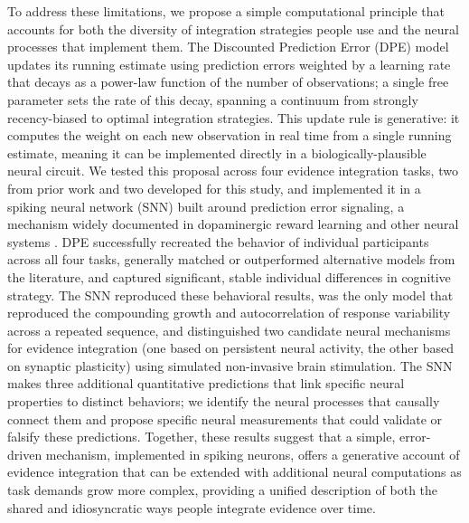 \documentclass[12pt]{article}
\begin{document}
To address these limitations, we propose a simple computational principle that accounts for both the diversity of integration strategies people use and the neural processes that implement them. The Discounted Prediction Error (DPE) model updates its running estimate using prediction errors weighted by a learning rate that decays as a power-law function of the number of observations; a single free parameter sets the rate of this decay, spanning a continuum from strongly recency-biased to optimal integration strategies. This update rule is generative: it computes the weight on each new observation in real time from a single running estimate, meaning it can be implemented directly in a biologically-plausible neural circuit. We tested this proposal across four evidence integration tasks, two from prior work \cite{prat2024imprecise, yoo2025people} and two developed for this study, and implemented it in a spiking neural network (SNN) built around prediction error signaling, a mechanism widely documented in dopaminergic reward learning and other neural systems \cite{glimcher2011understanding}. DPE successfully recreated the behavior of individual participants across all four tasks, generally matched or outperformed alternative models from the literature, and captured significant, stable individual differences in cognitive strategy. The SNN reproduced these behavioral results, was the only model that reproduced the compounding growth and autocorrelation of response variability across a repeated sequence, and distinguished two candidate neural mechanisms for evidence integration (one based on persistent neural activity, the other based on synaptic plasticity) using simulated non-invasive brain stimulation. The SNN makes three additional quantitative predictions that link specific neural properties to distinct behaviors; we identify the neural processes that causally connect them and propose specific neural measurements that could validate or falsify these predictions. Together, these results suggest that a simple, error-driven mechanism, implemented in spiking neurons, offers a generative account of evidence integration that can be extended with additional neural computations as task demands grow more complex, providing a unified description of both the shared and idiosyncratic ways people integrate evidence over time.
\end{document}
